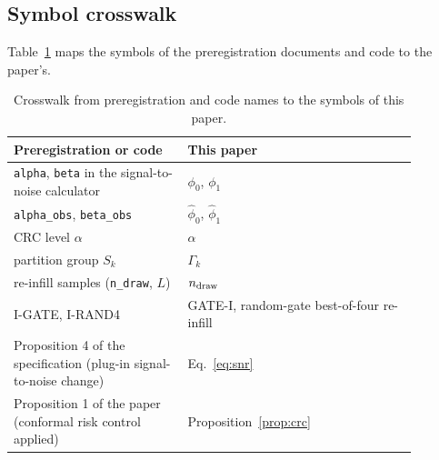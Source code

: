 \subsection{Symbol crosswalk}\label{app:crosswalk}
Table~\ref{tab:crosswalk} maps the symbols of the preregistration documents and code to the paper's.
\begin{table}[t]
\centering
\caption{Crosswalk from preregistration and code names to the symbols of this paper.}
\label{tab:crosswalk}
\footnotesize
\begin{tabular}{p{0.38\linewidth}p{0.5\linewidth}}
\toprule
Preregistration or code & This paper \\
\midrule
\texttt{alpha}, \texttt{beta} in the signal-to-noise calculator & $\phi_0$, $\phi_1$ \\
\texttt{alpha\_obs}, \texttt{beta\_obs} & $\hat\phi_0$, $\hat\phi_1$ \\
CRC level $\alpha$ & $\alpha$ \\
partition group $S_k$ & $\Gamma_k$ \\
re-infill samples (\texttt{n\_draw}, $L$) & $n_{\rm draw}$ \\
I-GATE, I-RAND4 & GATE-I, random-gate best-of-four re-infill \\
Proposition 4 of the specification (plug-in signal-to-noise change) & Eq.~\eqref{eq:snr} \\
Proposition 1 of the paper (conformal risk control applied) & Proposition~\ref{prop:crc} \\
\bottomrule
\end{tabular}
\end{table}

